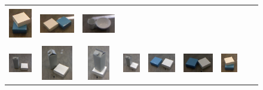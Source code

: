 \begin{figure}[h!]
\begin{tabular}{ccccccccc}
    \includegraphics[height=1.5cm]{pictures/71.jpg}&
    \includegraphics[height=1.5cm]{pictures/81.jpg}&
    \includegraphics[height=1.5cm]{pictures/91.jpg}\\ \includegraphics[height=1.5cm]{pictures/12.jpg}&
    \includegraphics[height=1.5cm]{pictures/22.jpg}&
    \includegraphics[height=1.5cm]{pictures/32.jpg}&
    \includegraphics[height=1.5cm]{pictures/42.jpg}&
    \includegraphics[height=1.5cm]{pictures/52.jpg}&
    \includegraphics[height=1.5cm]{pictures/62.jpg}&
    \includegraphics[height=1.5cm]{pictures/72.jpg}&

\end{tabular}
\end{figure}
